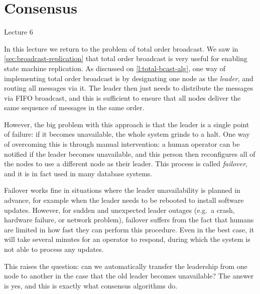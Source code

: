 \section{Consensus}\label{sec:consensus}

\begin{frame}
    \begin{center}
        Lecture 6\\[2em]
        \Large{\color{darkblue}{Consensus}}
    \end{center}
\end{frame}

In this lecture we return to the problem of total order broadcast.
We saw in \autoref{sec:broadcast-replication} that total order broadcast is very useful for enabling state machine replication.
As discussed on \autoref{l:total-bcast-alg}, one way of implementing total order broadcast is by designating one node as the \emph{leader}, and routing all messages via it.
The leader then just needs to distribute the messages via FIFO broadcast, and this is sufficient to ensure that all nodes deliver the same sequence of messages in the same order.

However, the big problem with this approach is that the leader is a single point of failure: if it becomes unavailable, the whole system grinds to a halt.
One way of overcoming this is through manual intervention: a human operator can be notified if the leader becomes unavailable, and this person then reconfigures all of the nodes to use a different node as their leader.
This process is called \emph{failover}, and it is in fact used in many database systems.

Failover works fine in situations where the leader unavailability is planned in advance, for example when the leader needs to be rebooted to install software updates.
However, for sudden and unexpected leader outages (e.g.\ a crash, hardware failure, or network problem), failover suffers from the fact that humans are limited in how fast they can perform this procedure.
Even in the best case, it will take several minutes for an operator to respond, during which the system is not able to process any updates.

This raises the question: can we automatically transfer the leadership from one node to another in the case that the old leader becomes unavailable?
The answer is yes, and this is exactly what consensus algorithms do.

